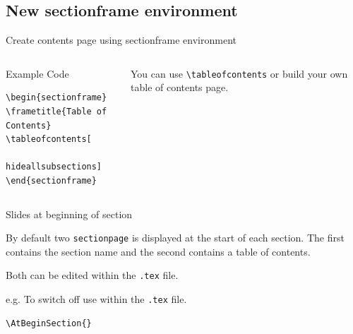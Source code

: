 \documentclass[aspectratio=169, 12pt]{beamer}    %
\begin{document}

\subsection{New sectionframe environment}
\begin{frame}[fragile]{Create contents page using sectionframe environment}
\begin{columns}
\begin{alertblock}{Example Code}

\begin{verbatim}
\begin{sectionframe}
\frametitle{Table of Contents}
\tableofcontents[
     hideallsubsections]
\end{sectionframe}
\end{verbatim}

\end{alertblock}

 You can use \verb|\tableofcontents| or build your own table of contents page.
\end{columns}
\end{frame}


\begin{frame}[fragile]{Slides at beginning of section}

By default two \verb|sectionpage| is displayed at the start of each section.
The first contains the section name and the second contains 
 a table of contents.

Both can be edited within the \verb|.tex| file.

e.g. To switch off use within the \verb|.tex| file.
\begin{verbatim}
\AtBeginSection{}
\end{verbatim}



\end{frame}
\end{document}
